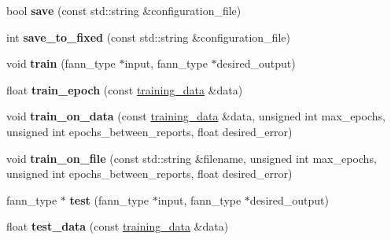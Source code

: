 \begin{DoxyCompactItemize}
\item 
\hypertarget{class_f_a_n_n_1_1neural__net_ad6ef58fbca65f2c3599d3eab270114dc}{bool {\bfseries save} (const std\-::string \&configuration\-\_\-file)}\label{class_f_a_n_n_1_1neural__net_ad6ef58fbca65f2c3599d3eab270114dc}

\item 
\hypertarget{class_f_a_n_n_1_1neural__net_a6c8fbefbfe3727334449438bbd64d28e}{int {\bfseries save\-\_\-to\-\_\-fixed} (const std\-::string \&configuration\-\_\-file)}\label{class_f_a_n_n_1_1neural__net_a6c8fbefbfe3727334449438bbd64d28e}

\item 
\hypertarget{class_f_a_n_n_1_1neural__net_aa8c8c498d982e6439cd770480ae5e0a0}{void {\bfseries train} (fann\-\_\-type $\ast$input, fann\-\_\-type $\ast$desired\-\_\-output)}\label{class_f_a_n_n_1_1neural__net_aa8c8c498d982e6439cd770480ae5e0a0}

\item 
\hypertarget{class_f_a_n_n_1_1neural__net_a3f8ed14311b11acc888d450f279f09e3}{float {\bfseries train\-\_\-epoch} (const \hyperlink{class_f_a_n_n_1_1training__data}{training\-\_\-data} \&data)}\label{class_f_a_n_n_1_1neural__net_a3f8ed14311b11acc888d450f279f09e3}

\item 
\hypertarget{class_f_a_n_n_1_1neural__net_a77a3d30f7ab3c8d2b57a5e1592fd1c9e}{void {\bfseries train\-\_\-on\-\_\-data} (const \hyperlink{class_f_a_n_n_1_1training__data}{training\-\_\-data} \&data, unsigned int max\-\_\-epochs, unsigned int epochs\-\_\-between\-\_\-reports, float desired\-\_\-error)}\label{class_f_a_n_n_1_1neural__net_a77a3d30f7ab3c8d2b57a5e1592fd1c9e}

\item 
\hypertarget{class_f_a_n_n_1_1neural__net_ab553f9f921497ff44a77f76ac5a52881}{void {\bfseries train\-\_\-on\-\_\-file} (const std\-::string \&filename, unsigned int max\-\_\-epochs, unsigned int epochs\-\_\-between\-\_\-reports, float desired\-\_\-error)}\label{class_f_a_n_n_1_1neural__net_ab553f9f921497ff44a77f76ac5a52881}

\item 
\hypertarget{class_f_a_n_n_1_1neural__net_ad8507a32ff624df0f3b141f1063cadc9}{fann\-\_\-type $\ast$ {\bfseries test} (fann\-\_\-type $\ast$input, fann\-\_\-type $\ast$desired\-\_\-output)}\label{class_f_a_n_n_1_1neural__net_ad8507a32ff624df0f3b141f1063cadc9}

\item 
\hypertarget{class_f_a_n_n_1_1neural__net_a347fbf2d6137297959a5aab7a013f141}{float {\bfseries test\-\_\-data} (const \hyperlink{class_f_a_n_n_1_1training__data}{training\-\_\-data} \&data)}\label{class_f_a_n_n_1_1neural__net_a347fbf2d6137297959a5aab7a013f141}


\end{DoxyCompactItemize}
